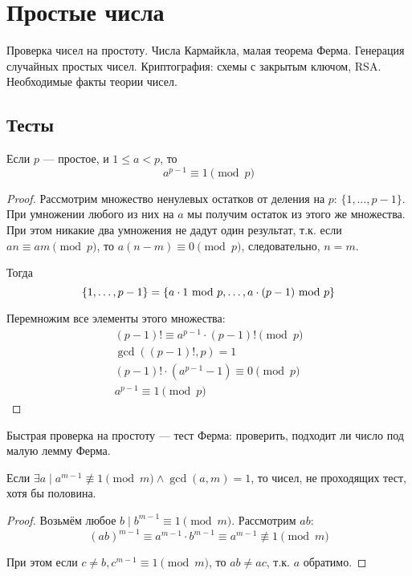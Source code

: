\section{Простые числа}
Проверка чисел на простоту.
Числа Кармайкла, малая теорема Ферма.
Генерация случайных простых чисел.
Криптография: схемы с закрытым ключом, RSA.
Необходимые факты теории чисел.

\subsection{Тесты}
\begin{theorem}
    Если $p$ --- простое, и $1 \leq a < p$, то
    \[ a^{p - 1} \equiv 1 \pmod p \]
\end{theorem}
\begin{proof}
    Рассмотрим множество ненулевых остатков от деления на $p$:
    $\{1, \ldots, p - 1\}$.
    При умножении любого из них на $a$ мы получим
    остаток из этого же множества.
    При этом никакие два умножения не дадут один результат,
    т.к. если
    $an \equiv am \pmod p$,
    то $a(n - m) \equiv 0 \pmod p$,
    следовательно, $n = m$.

    Тогда
    \[
        \{1, \ldots, p - 1\}
        = \{ a \cdot 1 ~\text{mod}~ p, \ldots, a \cdot (p - 1) ~\text{mod}~ p \}
    \]

    Перемножим все элементы этого множества:
    \begin{gather*}
        (p - 1)! \equiv a^{p - 1} \cdot (p - 1)! \pmod p \\
        \gcd((p - 1)!, p) = 1 \\
        (p - 1)! \cdot (a^{p - 1} - 1) \equiv 0 \pmod p \\
        a^{p - 1} \equiv 1 \pmod p
    \end{gather*}
\end{proof}

Быстрая проверка на простоту --- тест Ферма:
проверить, подходит ли число под малую лемму Ферма.

\begin{theorem}
    Если $\exists a \mid a^{m - 1} \not \equiv 1 \pmod m \land \gcd(a, m) = 1$,
    то чисел, не проходящих тест, хотя бы половина.
\end{theorem}
\begin{proof}
    Возьмём любое $b \mid b^{m - 1} \equiv 1 \pmod m$.
    Рассмотрим $ab$:
    \[
        (ab)^{m - 1}
        \equiv a^{m - 1} \cdot b^{m - 1}
        \equiv a^{m - 1} \not \equiv 1 \pmod m
    \]

    При этом если $c \ne b, c^{m - 1} \equiv 1 \pmod m$,
    то $ab \ne ac$, т.к. $a$ обратимо.
\end{proof}

